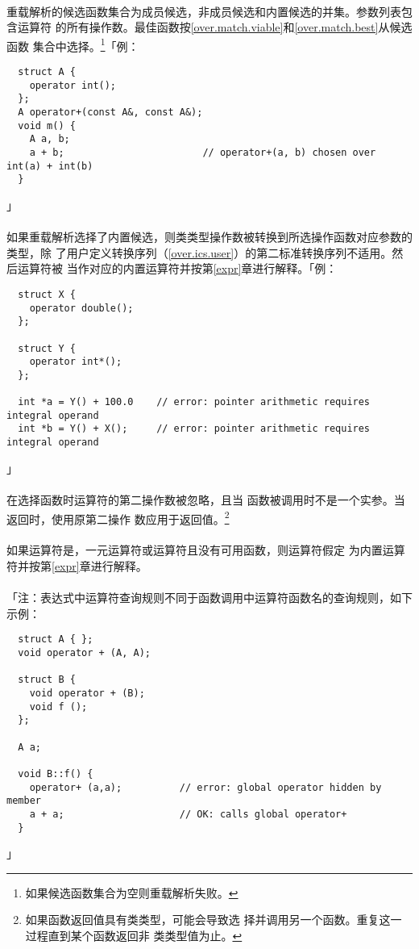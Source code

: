 \paragraph{}
重载解析的候选函数集合为成员候选，非成员候选和内置候选的并集。参数列表包含运算符
的所有操作数。最佳函数按\ref{over.match.viable}和\ref{over.match.best}从候选函数
集合中选择。\footnote{如果候选函数集合为空则重载解析失败。}「例：
\begin{lstlisting}
  struct A {
    operator int();
  };
  A operator+(const A&, const A&);
  void m() {
    A a, b;
    a + b;                        // operator+(a, b) chosen over int(a) + int(b)
  }
\end{lstlisting}」

\paragraph{}
如果重载解析选择了内置候选，则类类型操作数被转换到所选操作函数对应参数的类型，除
了用户定义转换序列（\ref{over.ics.user}）的第二标准转换序列不适用。然后运算符被
当作对应的内置运算符并按第\ref{expr}章进行解释。「例：
\begin{lstlisting}
  struct X {
    operator double();
  };

  struct Y {
    operator int*();
  };

  int *a = Y() + 100.0    // error: pointer arithmetic requires integral operand
  int *b = Y() + X();     // error: pointer arithmetic requires integral operand
\end{lstlisting}」

\paragraph{}
在选择函数时运算符\tm{->}的第二操作数被忽略，且当
函数被调用时不是一个实参。当返回时，使用原第二操作
数应用于返回值。\footnote{如果函数返回值具有类类型，可能会导致选
择并调用另一个函数。重复这一过程直到某个函数返回非
类类型值为止。}

\paragraph{}
如果运算符是\tm{,}，一元运算符\tm{\&}或运算符\tm{->}且没有可用函数，则运算符假定
为内置运算符并按第\ref{expr}章进行解释。

\paragraph{}
「注：表达式中运算符查询规则不同于函数调用中运算符函数名的查询规则，如下示例：
\begin{lstlisting}
  struct A { };
  void operator + (A, A);

  struct B {
    void operator + (B);
    void f ();
  };

  A a;

  void B::f() {
    operator+ (a,a);          // error: global operator hidden by member
    a + a;                    // OK: calls global operator+
  }
\end{lstlisting}」

